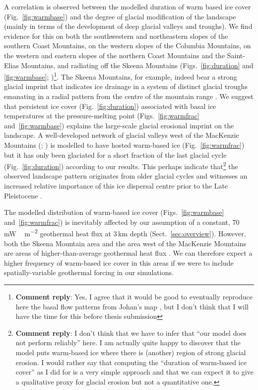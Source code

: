 \documentclass[tc, manuscript]{copernicus}
\newcommand{\renote}[1]{\footnote{\textbf{Comment reply}: #1}}
\begin{document}
A correlation is observed between the modelled duration of warm based ice cover
(Fig.~\ref{fig:warmbase}) and the degree of glacial modification of the
landscape (mainly in terms of the development of deep glacial valleys and
troughs). We find evidence for this on both the southwestern and northeastern
slopes of the southern Coast Mountains, on the western slopes of the Columbia
Mountains, on the western and eastern slopes of the northern Coast Mountains
and the Saint-Elias Mountains, and radiating off the Skeena Mountains
(Figs.~\ref{fig:duration} and \ref{fig:warmbase};
\citealp[Fig.~2]{Kleman.etal.2010})\renote{
    Yes, I agree that it would be good to eventually reproduce here the basal
    flow patterns from Johan's map \citep[Fig.~2]{Kleman.etal.2010}, but I
    don't think that I will have the time for this before thesis submission}.
The Skeena Mountains, for example, indeed bear a strong glacial imprint that
indicates ice drainage in a system of distinct glacial troughs emanating in a
radial pattern from the centre of the mountain range
\citep[Fig.~2]{Kleman.etal.2010}. We suggest that
persistent ice cover (Fig.~\ref{fig:duration}) associated with basal ice
temperatures at the pressure-melting point (Figs.~\ref{fig:warmfrac}
and~\ref{fig:warmbase}) explains the large-scale glacial erosional imprint on
the landscape. A well-developed network of glacial valleys west of
the MacKenzie Mountains (\citealp[Fig.~2]{Kleman.etal.2010}; \citealp[Fig.~8]
{Stroeven.etal.2010}) is modelled to have hosted warm-based ice
(Fig.~\ref{fig:warmfrac}) but it has only been glaciated for a short fraction
of the last glacial cycle (Fig.~\ref{fig:duration}) according to our
results. This perhaps indicate that\renote{
    I don't think that we have to infer that ``our model does not perform
    reliably'' here. I am actually quite happy to discover that the model
    puts warm-based ice where there is (another) region of strong glacial
    erosion. I would rather say that computing the ``duration of
    warm-based ice cover'' as I did for is a very simple approach and that we
    can expect it to give a qualitative proxy for glacial erosion but not a
    quantitative one.}
the observed landscape pattern originates from older glacial cycles and
witnesses an increased relative importance of this ice dispersal centre prior
to the Late Pleistocene \citep[cf.][]{Ward.etal.2008, Demuro.etal.2012}.

The modelled distribution of warm-based ice cover (Figs.~\ref{fig:warmbase}
and~\ref{fig:warmfrac}) is inevitably affected by our assumption of a constant,
70\,\unit{mW\,m^{-2}} geothermal heat flux at 3\,km depth
(Sect.~\ref{sec:overview}). However, both the Skeena Mountain area and the area
west of the MacKenzie Mountains are areas of higher-than-average geothermal
heat flux \citep{Blackwell.Richards.2004}. We can therefore expect a higher
frequency of warm-based ice cover in this areas if we were to include
spatially-variable geothermal forcing in our simulations.
\end{document}
